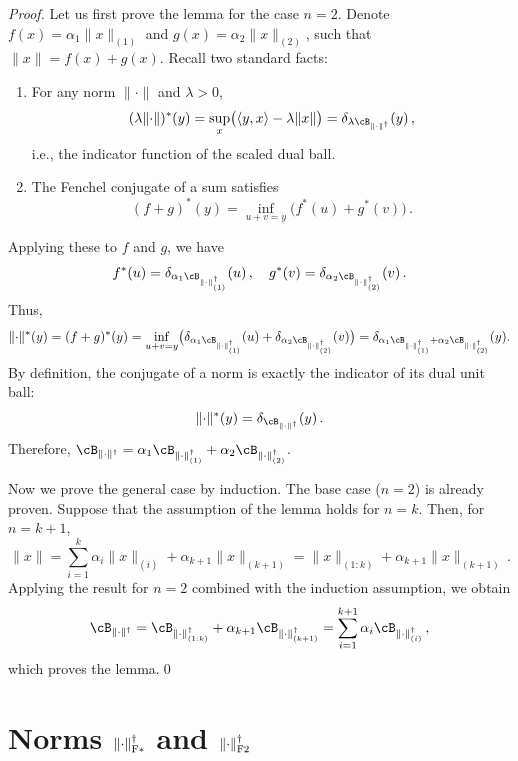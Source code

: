 \documentclass[smallextended,referee,envcountsect]{svjour3}
\newcommand{\norm}[1]{\lVert #1\rVert}
\DeclarePairedDelimiter{\normfstar}{\|}{\|_\mathrm{F*}}
\DeclarePairedDelimiter{\normftwo}{\|}{\|_\mathrm{F2}}
\begin{document}
 \begin{proof}
   Let us first prove the lemma for the case $n = 2$. Denote $f(x) = \alpha_1 \norm{x}_{(1)}$ and $g(x) = \alpha_2 \norm{x}_{(2)}$, such that $\norm{x} = f(x) + g(x)$. Recall two standard facts:
   \begin{enumerate}
     \item For any norm $\norm{\cdot}$ and $\lambda>0$,
           \[
             (\lambda \norm{\cdot})^*(y) =
             \sup_{x}\bigl( \langle y,x \rangle - \lambda \norm{x}\bigr)
             = \delta_{\lambda \cB_{\norm{\cdot}^\dagger}}(y)\,,
           \]
           i.e., the indicator function of the scaled dual ball.
     \item The Fenchel conjugate of a sum satisfies
           \[
             (f+g)^*(y) = \inf_{u+v=y} \bigl(f^*(u) + g^*(v)\bigr)\,.
           \]
   \end{enumerate}
   Applying these to $f$ and $g$, we have
   \[
     f^*(u) = \delta_{\alpha_1 \cB_{\norm{\cdot}_{(1)}^\dagger}}(u)\,,
     \quad
     g^*(v) = \delta_{\alpha_2 \cB_{\norm{\cdot}_{(2)}^\dagger}}(v)\,.
   \]
   Thus,
   \[
     \norm{\cdot}^*(y)
     = (f+g)^*(y)
     = \inf_{u+v=y}
     \bigl(
     \delta_{\alpha_1 \cB_{\norm{\cdot}_{(1)}^\dagger}}(u)
     +
     \delta_{\alpha_2 \cB_{\norm{\cdot}_{(2)}^\dagger}}(v)
     \bigr)
     =
     \delta_{\alpha_1 \cB_{\norm{\cdot}_{(1)}^\dagger}+\alpha_2 \cB_{\norm{\cdot}_{(2)}^\dagger}}(y).
   \]
   By definition, the conjugate of a norm is exactly the indicator of its dual unit ball:
   \[
   \norm{\cdot}^*(y) = \delta_{\cB_{\norm{\cdot}^\dagger}}(y)\,.
   \]
   Therefore, $\cB_{\norm{\cdot}^\dagger} = \alpha_1 \cB_{\norm{\cdot}_{(1)}^\dagger} + \alpha_2 \cB_{\norm{\cdot}_{(2)}^\dagger}$.
 
   Now we prove the general case by induction. The base case ($n=2$) is already proven. Suppose that the assumption of the lemma holds for $n = k$. Then, for $n = k + 1$,
   \[
   \norm{x} = \sum_{i = 1}^k \alpha_i \norm{x}_{(i)} + \alpha_{k + 1}\norm{x}_{(k + 1)} = \norm{x}_{(1:k)} + \alpha_{k + 1}\norm{x}_{(k + 1)}\,.
   \]
   Applying the result for $n=2$ combined with the induction assumption, we obtain
   \[
   \cB_{\norm{\cdot}^\dagger} = \cB_{\norm{\cdot}_{(1:k)}^\dagger} + \alpha_{k + 1} \cB_{\norm{\cdot}_{(k + 1)}^\dagger} = \sum_{i = 1}^{k + 1} \alpha_i \cB_{\norm{\cdot}_{(i)}^\dagger}\,,
   \]
   which proves the lemma.\qed
\end{proof}
 
 \section[Norms for F-Muon and F-Neon]%
         {Norms $\normfstar{\cdot}^\dagger$ and $\normftwo{\cdot}^\dagger$}
 \label{sec:f2_fstar_norms}
 
\end{document}
